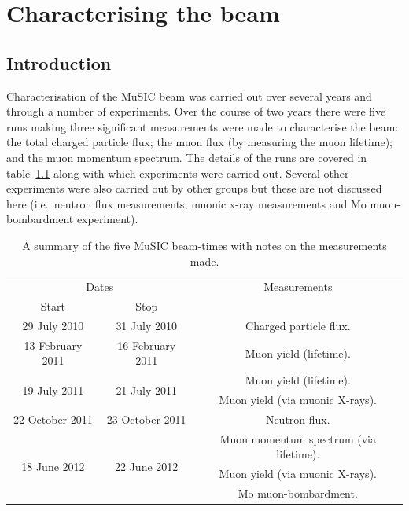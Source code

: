 \chapter{Characterising the beam} %
\label{prt:characterising_the_beam}
\section{Introduction} %
\label{cha:introduction}
Characterisation of the MuSIC beam was carried out over several years and through a number of experiments. Over the course of two years there were five runs making three significant measurements were made to characterise the beam: the total charged particle flux; the muon flux (by measuring the muon lifetime); and the muon momentum spectrum. The details of the runs are covered in table~\ref{tab:summary_music_beam_time} along with which experiments were carried out. Several other experiments were also carried out by other groups but these are not discussed here (i.e.\ neutron flux measurements, muonic x-ray measurements and Mo muon-bombardment experiment).
\begin{table}[htpb]
  \begin{center}
    \begin{tabular}{c|c|c}
      \multicolumn{2}{c|}{Dates}          & Measurements                                \\
      Start            & Stop             &                                             \\
      \hline                                                                             
      29 July 2010     & 31 July 2010     & Charged particle flux.                      \\
      \hline
      13 February 2011 & 16 February 2011 & Muon yield (lifetime).                      \\
      \hline
      \multirow{2}{*}{19 July 2011}
                       & \multirow{2}{*}{21 July 2011}
                                          & Muon yield (lifetime).                      \\
                       &                  & Muon yield (via muonic X-rays).             \\
      \hline
      22 October 2011  & 23 October 2011  & Neutron flux.                               \\
      \hline
      \multirow{3}{*}{18 June 2012}
                       & \multirow{3}{*}{22 June 2012}    
                                          & Muon momentum spectrum (via lifetime).      \\
                       &                  & Muon yield (via muonic X-rays).             \\
                       &                  & Mo muon-bombardment.                        \\
    \end{tabular}
  \end{center}
  \caption{A summary of the five MuSIC beam-times with notes on the measurements made.}
  \label{tab:summary_music_beam_time}
\end{table}

